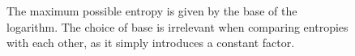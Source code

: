 \begin{figure}[thb!p]
{%
        The maximum possible entropy is given by the base of the logarithm.
        The choice of base is irrelevant when comparing entropies with each other,
        as it simply introduces a constant factor.
    }
    \label{fig:entropy}
\end{figure}
